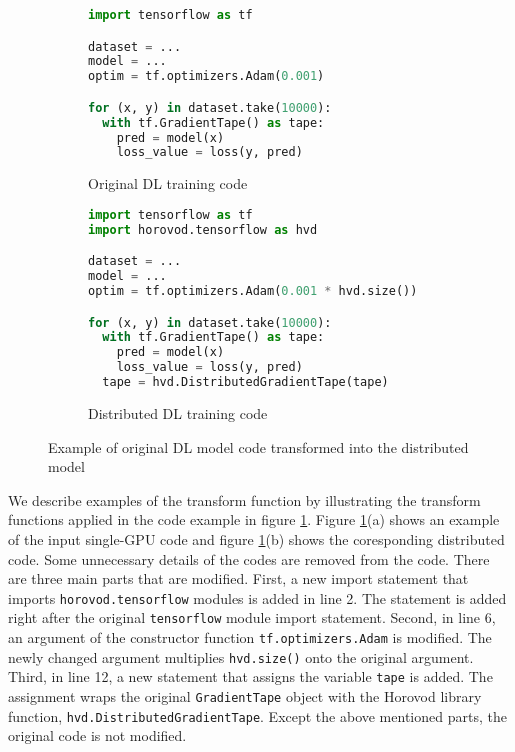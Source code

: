 \begin{figure}[ht!]
  \centering
  \begin{subfigure}[t]{0.48\textwidth}
    \begin{lstlisting}[language=Python]
import tensorflow as tf

dataset = ...
model = ...
optim = tf.optimizers.Adam(0.001) 

for (x, y) in dataset.take(10000):
  with tf.GradientTape() as tape:
    pred = model(x)
    loss_value = loss(y, pred)\end{lstlisting} 
    \caption{Original DL training code}
  \end{subfigure}
  \hspace{5mm}
  \begin{subfigure}[t]{0.48\textwidth}
    \begin{lstlisting}[language=Python]
import tensorflow as tf
import horovod.tensorflow as hvd

dataset = ...
model = ...
optim = tf.optimizers.Adam(0.001 * hvd.size()) 

for (x, y) in dataset.take(10000):
  with tf.GradientTape() as tape:
    pred = model(x)
    loss_value = loss(y, pred) 
  tape = hvd.DistributedGradientTape(tape)\end{lstlisting}
    \caption{Distributed DL training code}
  \end{subfigure}
  \caption{Example of original DL model code transformed into the distributed model}
  \label{fig:trans:ex}
\end{figure}

We describe examples of the transform function by illustrating the transform
functions applied in the code example in figure \ref{fig:trans:ex}.
Figure \ref{fig:trans:ex}(a) shows an example of the input single-GPU code and
figure \ref{fig:trans:ex}(b) shows the coresponding distributed code. 
Some unnecessary details of the codes are removed from the code.
There are three main parts that are modified.
First, a new import statement that imports {\tt horovod.tensorflow} modules
is added in line 2. 
The statement is added right after the original {\tt tensorflow} module
import statement.
Second, in line 6, an argument of the constructor function 
{\tt tf.optimizers.Adam} is modified. The newly changed argument multiplies
{\tt hvd.size()} onto the original argument.
Third, in line 12, a new statement that assigns the variable {\tt tape}
is added. The assignment wraps the original {\tt GradientTape} object with
the Horovod library function, {\tt hvd.DistributedGradientTape}.
Except the above mentioned parts, the original code is not modified.     

